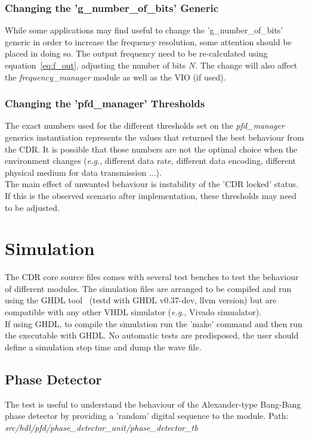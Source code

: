 \documentclass[11pt]{article}
\renewcommand{\>}{\rangle} \renewcommand{\emptyset}{\varnothing}
\begin{document}
\subsubsection{Changing the 'g\_number\_of\_bits' Generic}
While some applications may find useful to change the 'g\_number\_of\_bits'
generic in order to increase the frequency resolution, some attention should be
placed in doing so. The output frequency need to be re-calculated using
equation~\ref{eq:f_out}, adjusting the number of bits $N$. The change will also
affect the \textit{frequency\_manager} module as well as the VIO (if used).

\subsubsection{Changing the 'pfd\_manager' Thresholds}
The exact numbers used for the different thresholds set on the
\textit{pfd\_manager} generics instantiation represents the values that returned
the best behaviour from the CDR. It is possible that those numbers are not the
optimal choice when the environment changes (\textit{e.g.}, different data rate,
different data encoding, different physical medium for data transmission ...).\\
The main effect of unwanted behaviour is instability of the 'CDR locked' status.
If this is the observed scenario after implementation, these thresholds may need
to be adjusted.

\section{Simulation}
The CDR core source files comes with several test benches to test the behaviour
of different modules. The simulation files are arranged to be compiled and run
using the GHDL tool~\cite{ref:ghdl} (testd with GHDL v0.37-dev, llvm version)
but are compatible
with any other VHDL simulator (\textit{e.g.}, Vivado simualator).\\
If using GHDL, to compile the simulation run the 'make' command and then run the
executable with GHDL. No automatic tests are predisposed, the user should define
a simulation stop time and dump the wave file.

\subsection{Phase Detector}
The test is useful to understand the behaviour of the Alexander-type Bang-Bang
phase detector by providing a 'random' digital sequence to the module.\bigbreak
Path: \textit{src/hdl/pfd/phase\_detector\_unit/phase\_detector\_tb}
\end{document}
